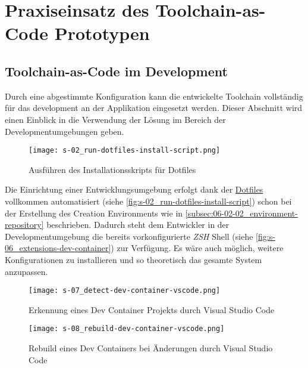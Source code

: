 \section{Praxiseinsatz des Toolchain-as-Code Prototypen}
\label{sec:06-03_practical-use-of-the-toolchain-as-code-prototype}

\subsection{Toolchain-as-Code im Development}
\label{subsec:06-03-01_toolchain-as-code-in-development}

Durch eine abgestimmte Konfiguration kann die entwickelte Toolchain vollständig für das \Gls{development} an der Applikation eingesetzt werden. Dieser Abschnitt wird einen Einblick in die Verwendung der  Lösung im Bereich der Developmentumgebungen geben.

\begin{wrapfigure}{l}{0.7\textwidth}
    \vspace{-10pt}
    \centering
    \texttt{[image: s-02\_run-dotfiles-install-script.png]}
    \caption{Ausführen des Installationsskripts für Dotfiles}
    \label{fig:s-02_run-dotfiles-install-script}
    \vspace{-05pt}
\end{wrapfigure}

Die Einrichtung einer Entwicklungsumgebung erfolgt dank der \hyperref[sec:03-04_dotfiles]{Dotfiles} vollkommen automatisiert (siehe \autoref{fig:s-02_run-dotfiles-install-script}) schon bei der Erstellung des Creation Environments wie in \autoref{subsec:06-02-02_environment-repository} beschrieben. Dadurch steht dem Entwickler in der Developmentumgebung die bereits vorkonfigurierte \textit{ZSH} Shell (siehe \autoref{fig:s-06_extensions-dev-container}) zur Verfügung. Es wäre auch möglich, weitere Konfigurationen zu installieren und so theoretisch das gesamte System anzupassen.

\begin{figure}[h]
    \centering
    \begin{minipage}[b]{0.49\textwidth}
        \centering
        \texttt{[image: s-07\_detect-dev-container-vscode.png]}
        \caption{Erkennung eines Dev Container Projekts durch Visual Studio Code}
        \label{fig:s-07_detect-dev-container-vscode}
    \end{minipage}
    \hfill
    \begin{minipage}[b]{0.49\textwidth}
        \centering
        \texttt{[image: s-08\_rebuild-dev-container-vscode.png]}
        \caption{Rebuild eines Dev Containers bei Änderungen durch Visual Studio Code}
        \label{fig:s-08_rebuild-dev-container-vscode}
    \end{minipage}
\end{figure}

